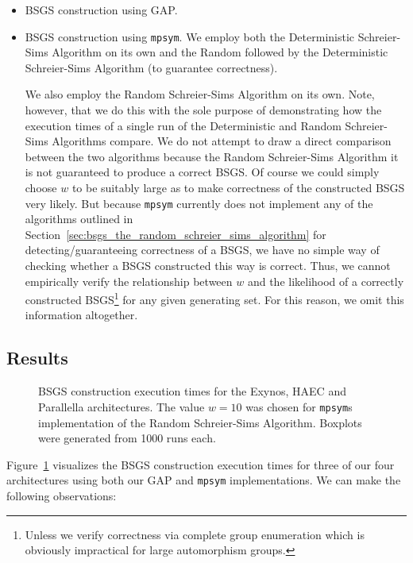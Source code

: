 \begin{itemize}
\item BSGS construction using GAP.

\item BSGS construction using \texttt{mpsym}. We employ both the Deterministic
Schreier-Sims Algorithm on its own and the Random followed by the Deterministic
Schreier-Sims Algorithm (to guarantee correctness).

We also employ the Random Schreier-Sims Algorithm on its own. Note, however,
that we do this with the sole purpose of demonstrating how the execution times
of a single run of the Deterministic and Random Schreier-Sims Algorithms
compare.
%
We do not attempt to draw a direct comparison between the two algorithms
because the Random Schreier-Sims Algorithm it is not guaranteed to produce a
correct BSGS.
%
Of course we could simply choose $w$ to be suitably large as to make
correctness of the constructed BSGS very likely.
%
But because \texttt{mpsym} currently does not implement any of the algorithms
outlined in Section~\ref{sec:bsgs_the_random_schreier_sims_algorithm} for
detecting/guaranteeing correctness of a BSGS, we have no simple way of checking
whether a BSGS constructed this way is correct. Thus, we cannot empirically
verify the relationship between $w$ and the likelihood of a correctly
constructed BSGS\footnote{Unless we verify correctness via complete group
enumeration which is obviously impractical for large automorphism groups.} for
any given generating set. For this reason, we omit this information altogether.
\end{itemize}

\subsection{Results}

\begin{figure}
  \centering
  \caption{BSGS construction execution times for the Exynos, HAEC and
           Parallella architectures. The value $w = 10$ was chosen for
           \texttt{mpsym}s implementation of the Random Schreier-Sims Algorithm.
           Boxplots were generated from 1000 runs each.}
  \label{fig:bsgs_boxplot}
\end{figure}

Figure~\ref{fig:bsgs_boxplot} visualizes the BSGS construction execution times
for three of our four architectures using both our GAP and \texttt{mpsym}
implementations.  We can make the following observations:

